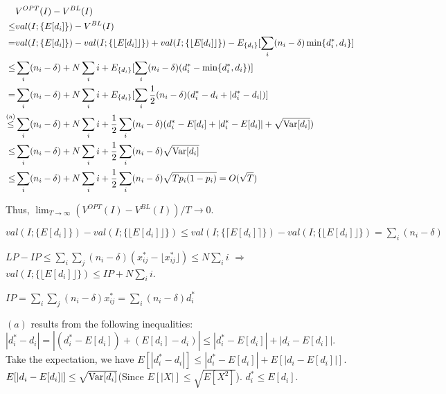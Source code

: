 \begin{align*}
   & V^{OPT}(I) - V^{BL}(I) \\
\leq & val(I; \{E[d_{i}]\}) - V^{BL}(I) \\
= & val(I; \{E[d_{i}]\}) - val(I; \{\lfloor E[d_{i}]\rfloor\}) + val(I; \{\lfloor E[d_{i}]\rfloor\}) - E_{\{d_{i}\}}[\sum_{i} (n_{i}-\delta) \min\{d_{i}^{*}, d_{i}\}] \\
\leq & \sum_{i} (n_{i} - \delta) + N \sum_{i} i + E_{\{d_{i}\}}[\sum_{i} (n_{i}-\delta) (d_{i}^{*} - \min\{d_{i}^{*}, d_{i}\})] \\
= & \sum_{i} (n_{i} - \delta) + N \sum_{i} i + E_{\{d_{i}\}}[\sum_{i} \frac{1}{2}(n_{i}-\delta) (d_{i}^{*} - d_{i} + |d_{i}^{*} - d_{i}|)] \\
\overset{\text{(a)}}{\leq} & \sum_{i} (n_{i} - \delta) + N \sum_{i} i + \frac{1}{2} \sum_{i} (n_{i}-\delta)(d_{i}^{*} - E[d_{i}] + |d_{i}^{*} - E[d_{i}]| + \sqrt{\operatorname{{Var}}[d_{i}]}) \\
\leq & \sum_{i} (n_{i} - \delta) + N \sum_{i} i + \frac{1}{2} \sum_{i} (n_{i}-\delta) \sqrt{\operatorname{{Var}}[d_{i}]} \\
\leq & \sum_{i} (n_{i} - \delta) + N \sum_{i} i + \frac{1}{2} \sum_{i} (n_{i}-\delta) \sqrt{T p_{i} (1- p_{i})} = O(\sqrt{T})
\end{align*}

Thus, $\lim_{T \to \infty} (V^{OPT}(I) - V^{BL}(I))/T \to 0$.

$val(I; \{E[d_{i}]\}) - val(I; \{\lfloor E[d_{i}]\rfloor\}) \leq val(I; \{\lceil E[d_{i}]\rceil\}) - val(I; \{\lfloor E[d_{i}]\rfloor\}) = \sum_{i} (n_{i} - \delta)$


$LP -IP \leq \sum_{i} \sum_{j} (n_{i} - \delta) (x_{ij}^{*} - \lfloor x_{ij}^{*} \rfloor) \leq N \sum_{i} i$ $\Rightarrow$ $val(I; \{\lfloor E[d_{i}]\rfloor\}) \leq IP + N \sum_{i} i$.

$IP = \sum_{i} \sum_{j} (n_{i} - \delta) x_{ij}^{*} = \sum_{i} (n_{i} - \delta) d_{i}^{*}$

$(a)$ results from the following inequalities: $|d_{i}^{*} -d_{i}| = |(d_{i}^{*}-E[d_{i}]) + (E[d_{i}] -d_{i})| \leq |d_{i}^{*}-E[d_{i}]| + |d_{i} - E[d_{i}]|$. Take the expectation, we have $E[|d_{i}^{*} -d_{i}|]\leq |d_{i}^{*}-E[d_{i}]| + E[|d_{i} - E[d_{i}]|]$. $E[|d_{i} - E[d_{i}]|] \leq \sqrt{\operatorname{{Var}}[d_{i}]}$(Since $E[|X|] \leq \sqrt{E[X^{2}]}$). $d_{i}^{*} \leq E[d_{i}]$.



